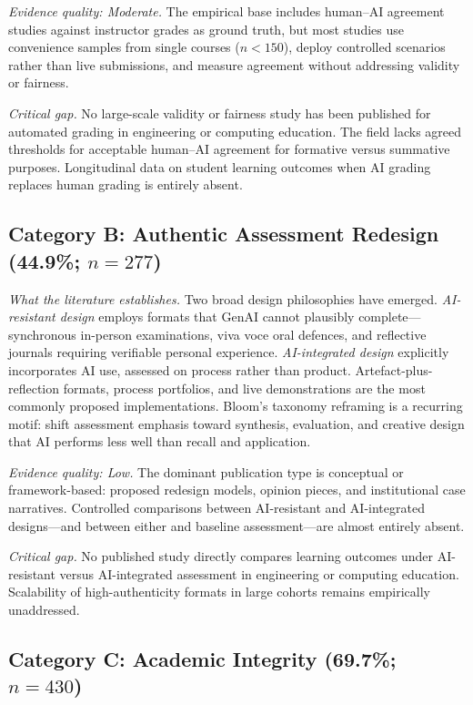 \documentclass[conference]{IEEEtran}
\begin{document}
\textit{Evidence quality: Moderate.}
The empirical base includes human--AI agreement studies against instructor grades as ground truth,
but most studies use convenience samples from single courses ($n < 150$), deploy controlled scenarios
rather than live submissions, and measure agreement without addressing validity or fairness.

\textit{Critical gap.}
No large-scale validity or fairness study has been published for automated grading in engineering
or computing education. The field lacks agreed thresholds for acceptable human--AI agreement for
formative versus summative purposes. Longitudinal data on student learning outcomes when AI grading
replaces human grading is entirely absent.

\subsection{Category B: Authentic Assessment Redesign (44.9\%; $n = 277$)}

\textit{What the literature establishes.}
Two broad design philosophies have emerged. \textit{AI-resistant design} employs formats that GenAI
cannot plausibly complete---synchronous in-person examinations, viva voce oral defences, and
reflective journals requiring verifiable personal experience. \textit{AI-integrated design} explicitly
incorporates AI use, assessed on process rather than product. Artefact-plus-reflection formats,
process portfolios, and live demonstrations are the most commonly proposed implementations. Bloom's
taxonomy reframing is a recurring motif: shift assessment emphasis toward synthesis, evaluation, and
creative design that AI performs less well than recall and application.

\textit{Evidence quality: Low.}
The dominant publication type is conceptual or framework-based: proposed redesign models, opinion
pieces, and institutional case narratives. Controlled comparisons between AI-resistant and AI-integrated
designs---and between either and baseline assessment---are almost entirely absent.

\textit{Critical gap.}
No published study directly compares learning outcomes under AI-resistant versus AI-integrated
assessment in engineering or computing education. Scalability of high-authenticity formats in large
cohorts remains empirically unaddressed.

\subsection{Category C: Academic Integrity (69.7\%; $n = 430$)}
\end{document}
